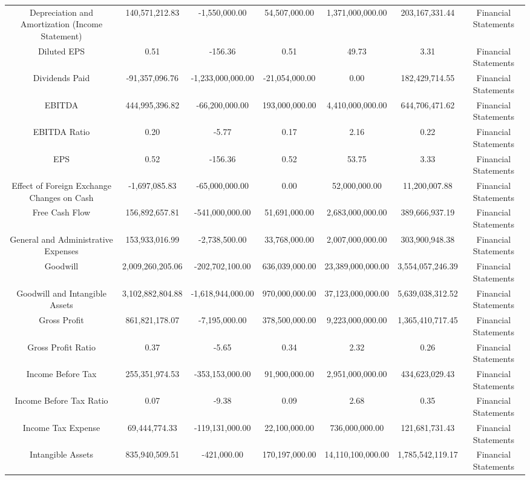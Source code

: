 \begin{longtable}{ccccccc}
Depreciation and Amortization (Income Statement) & 140,571,212.83 & -1,550,000.00 & 54,507,000.00 & 1,371,000,000.00 & 203,167,331.44 & Financial Statements \\
Diluted EPS & 0.51 & -156.36 & 0.51 & 49.73 & 3.31 & Financial Statements \\
Dividends Paid & -91,357,096.76 & -1,233,000,000.00 & -21,054,000.00 & 0.00 & 182,429,714.55 & Financial Statements \\
EBITDA & 444,995,396.82 & -66,200,000.00 & 193,000,000.00 & 4,410,000,000.00 & 644,706,471.62 & Financial Statements \\
EBITDA Ratio & 0.20 & -5.77 & 0.17 & 2.16 & 0.22 & Financial Statements \\
EPS & 0.52 & -156.36 & 0.52 & 53.75 & 3.33 & Financial Statements \\
Effect of Foreign Exchange Changes on Cash & -1,697,085.83 & -65,000,000.00 & 0.00 & 52,000,000.00 & 11,200,007.88 & Financial Statements \\
Free Cash Flow & 156,892,657.81 & -541,000,000.00 & 51,691,000.00 & 2,683,000,000.00 & 389,666,937.19 & Financial Statements \\
General and Administrative Expenses & 153,933,016.99 & -2,738,500.00 & 33,768,000.00 & 2,007,000,000.00 & 303,900,948.38 & Financial Statements \\
Goodwill & 2,009,260,205.06 & -202,702,100.00 & 636,039,000.00 & 23,389,000,000.00 & 3,554,057,246.39 & Financial Statements \\
Goodwill and Intangible Assets & 3,102,882,804.88 & -1,618,944,000.00 & 970,000,000.00 & 37,123,000,000.00 & 5,639,038,312.52 & Financial Statements \\
Gross Profit & 861,821,178.07 & -7,195,000.00 & 378,500,000.00 & 9,223,000,000.00 & 1,365,410,717.45 & Financial Statements \\
Gross Profit Ratio & 0.37 & -5.65 & 0.34 & 2.32 & 0.26 & Financial Statements \\
Income Before Tax & 255,351,974.53 & -353,153,000.00 & 91,900,000.00 & 2,951,000,000.00 & 434,623,029.43 & Financial Statements \\
Income Before Tax Ratio & 0.07 & -9.38 & 0.09 & 2.68 & 0.35 & Financial Statements \\
Income Tax Expense & 69,444,774.33 & -119,131,000.00 & 22,100,000.00 & 736,000,000.00 & 121,681,731.43 & Financial Statements \\
Intangible Assets & 835,940,509.51 & -421,000.00 & 170,197,000.00 & 14,110,100,000.00 & 1,785,542,119.17 & Financial Statements \\

\end{longtable}
